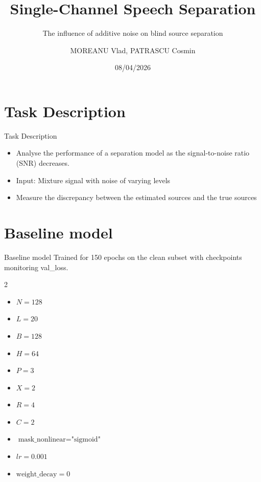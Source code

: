 \documentclass{beamer}
\author{MOREANU Vlad, PATRASCU Cosmin}
\title{Single-Channel Speech Separation}
\subtitle{The influence of additive noise on blind source separation}
\institute{National University of Science and Technology POLITEHNICA Bucharest}
\date{08/04/2026}
\begin{document}
\begin{frame}
    \titlepage
    \begin{figure}[htpb]
        \begin{center}
        \end{center}
    \end{figure}
\end{frame}


\section{Task Description}

\begin{frame}{Task Description}
    \begin{itemize} %
        \item Analyse the performance of a separation model as the signal-to-noise ratio (SNR) decreases.
        \item Input: Mixture signal with noise of varying levels
        \item Measure the discrepancy between the estimated sources and the true sources
    \end{itemize}
\end{frame}

\section{Baseline model}
\begin{frame}{Baseline model}
    Trained for 150 epochs on the clean subset with checkpoints monitoring
    val\_loss.
    \begin{multicols}{2}
        \begin{itemize}
            \item $ N = 128 $
            \item $ L = 20 $
            \item $ B = 128 $
            \item $ H = 64 $
            \item $ P = 3 $
            \item $ X = 2 $
            \item $ R = 4 $
            \item $ C = 2 $
            \item $ \text{mask\_nonlinear} = \text{"sigmoid"} $
        \end{itemize}
        \columnbreak
        \begin{itemize}
            \item $ lr = 0.001 $
            \item $ \text{weight\_decay} = 0 $
        \end{itemize}
    \end{multicols}
\end{frame}
\end{document}
